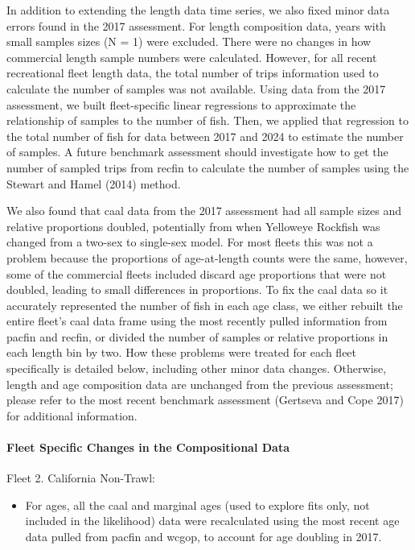 \documentclass[
]{scrartcl}
\let\oldparagraph\paragraph
\renewcommand{\paragraph}[1]{\oldparagraph{#1}\mbox{}}
\providecommand{\tightlist}{%
  \setlength{\itemsep}{0pt}\setlength{\parskip}{0pt}}\usepackage{longtable,booktabs,array}
\begin{document}
In addition to extending the length data time series, we also fixed
minor data errors found in the 2017 assessment. For length composition
data, years with small samples sizes (N = 1) were excluded. There were
no changes in how commercial length sample numbers were calculated.
However, for all recent recreational fleet length data, the total number
of trips information used to calculate the number of samples was not
available. Using data from the 2017 assessment, we built fleet-specific
linear regressions to approximate the relationship of samples to the
number of fish. Then, we applied that regression to the total number of
fish for data between 2017 and 2024 to estimate the number of samples. A
future benchmark assessment should investigate how to get the number of
sampled trips from \gls{recfin} to calculate the number of samples using
the Stewart and Hamel (2014) method.

We also found that \gls{caal} data from the 2017 assessment had all
sample sizes and relative proportions doubled, potentially from when
Yelloweye Rockfish was changed from a two-sex to single-sex model. For
most fleets this was not a problem because the proportions of
age-at-length counts were the same, however, some of the commercial
fleets included discard age proportions that were not doubled, leading
to small differences in proportions. To fix the \gls{caal} data so it
accurately represented the number of fish in each age class, we either
rebuilt the entire fleet's \gls{caal} data frame using the most recently
pulled information from \gls{pacfin} and \gls{recfin}, or divided the
number of samples or relative proportions in each length bin by two. How
these problems were treated for each fleet specifically is detailed
below, including other minor data changes. Otherwise, length and age
composition data are unchanged from the previous assessment; please
refer to the most recent benchmark assessment (Gertseva and Cope 2017)
for additional information.

\paragraph{Fleet Specific Changes in the Compositional
Data}\label{fleet-specific-changes-in-the-compositional-data}

Fleet 2. California Non-Trawl:

\begin{itemize}
\tightlist
\item
  For ages, all the \gls{caal} and marginal ages (used to explore fits
  only, not included in the likelihood) data were recalculated using the
  most recent age data pulled from \gls{pacfin} and \gls{wcgop}, to
  account for age doubling in 2017.
\end{itemize}
\end{document}
